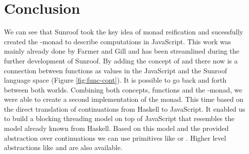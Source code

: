 
\section{Conclusion}

We can see that Sunroof took the key idea of monad reification and
sucessfully created the \JS-monad to describe computations
in JavaScript. This work was mainly already done by Farmer and
Gill \cite{Farmer:12:WebDSLs} and has been streamlined during the 
further development of Sunroof. By adding the concept 
of  and  there now is a connection between
functions as values in the JavaScript and the Sunroof language space 
(Figure \ref{fig:func-cont}). It is possible to go back and forth between 
both worlds. Combining both concepts, functions and the \JS-monad,
we were able to create a second implementation of the monad. This
time based on the direct translation of continuations from Haskell
to JavaScript. It enabled us to build a blocking threading model
on top of JavaScript that resembles the model already known from Haskell.
Based on this model and the provided abstraction over continuations
we can use primitives like  or .
Higher level abstractions like  and  are also
available. 
